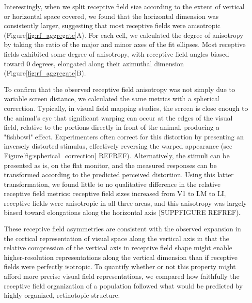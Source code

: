 Interestingly, when we split receptive field size according to the extent of vertical or horizontal space covered, we found that the horizontal dimension was consistently larger, suggesting that most receptive fields were anisotropic (Figure\ref{fig:rf_aggregate}A). For each cell, we calculated the degree of anisotropy by taking the ratio of the major and minor axes of the fit ellipses. Most receptive fields exhibited some degree of anisotropy, with receptive field angles biased toward 0 degrees, elongated along their azimuthal dimension (Figure\ref{fig:rf_aggregate}B). 

To confirm that the observed receptive field anisotropy was not simply due to variable screen distance, we calculated the same metrics with a spherical correction. Typically, in visual field mapping studies, the screen is close enough to the animal's eye that significant warping can occur at the edges of the visual field, relative to the portions directly in front of the animal, producing a "fishbowl" effect. Experimenters often correct for this distortion by presenting an inversely distorted stimulus, effectively reversing the warped appearance (see Figure\ref{fig:spherical_correction} REFREF). Alternatively, the stimuli can be presented as is, on the flat monitor, and the measured responses can be transformed according to the predicted perceived distortion. Using this latter transformation, we found little to no qualitative difference in the relative receptive field metrics: receptive field sizes increased from V1 to LM to LI, receptive fields were anisotropic in all three areas, and this anisotropy was largely biased toward elongations along the horizontal axis (SUPPFIGURE REFREF).

These receptive field asymmetries are consistent with the observed expansion in the cortical representation of visual space along the vertical axis in that the relative compression of the vertical axis in receptive field shape might enable higher-resolution representations along the vertical dimension than if receptive fields were perfectly isotropic. To quantify whether or not this property might afford more precise visual field representations, we compared how faithfully the receptive field organization of a population followed what would be predicted by highly-organized, retinotopic structure. 

